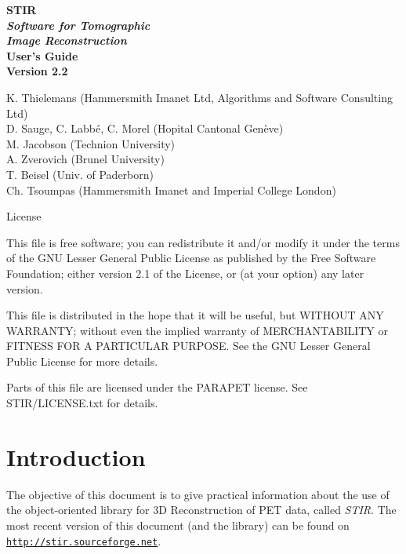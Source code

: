 \documentclass{article}
\def\R2Lurl#1#2{\mbox{\href{#1}{\tt #2}}}
\begin{document}
\begin{spacing}{2}
\begin{center}

\textbf{
{\Huge  STIR} 
\huge
\\[1cm]
\textit{ Software for  Tomographic \\ Image Reconstruction}
}
\\[3cm]

\textbf{{\huge User's Guide\\
 Version 2.2}}
\end{center}

\end{spacing}

\large 

\noindent 
K. Thielemans (Hammersmith Imanet Ltd, Algorithms and Software Consulting Ltd)\\
D. Sauge, C. Labb\'e, C. Morel (Hopital Cantonal Gen\`eve)\\
M. Jacobson (Technion University)\\
A. Zverovich (Brunel University) \\
T. Beisel (Univ. of Paderborn) \\
Ch. Tsoumpas (Hammersmith Imanet and Imperial College London)

\begin{center}
License
\end{center}
    This file is free software; you can redistribute it and/or modify
    it under the terms of the GNU Lesser General Public License as published by
    the Free Software Foundation; either version 2.1 of the License, or
    (at your option) any later version.

    This file is distributed in the hope that it will be useful,
    but WITHOUT ANY WARRANTY; without even the implied warranty of
    MERCHANTABILITY or FITNESS FOR A PARTICULAR PURPOSE.  See the
    GNU Lesser General Public License for more details.

    Parts of this file are licensed under the PARAPET license.     
    See STIR/LICENSE.txt for details.

\newpage

\tableofcontents


\section{
Introduction}

The objective of this document is to give practical information 
about the use of the object-oriented library for 3D Reconstruction 
of PET data, called \textit{STIR}. The most recent version of this 
document (and the library) can be found on \\
\R2Lurl{http://stir.sourceforge.net}{http://stir.sourceforge.net}.
\end{document}
